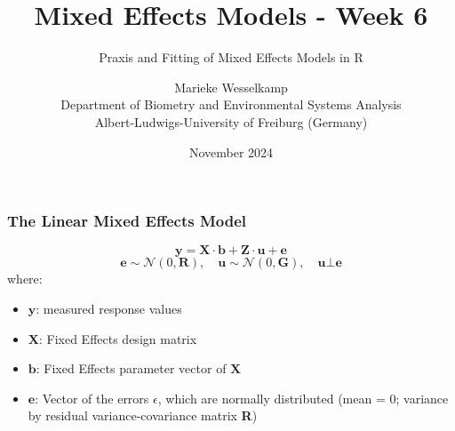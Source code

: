 \documentclass{beamer}
\title{Mixed Effects Models - Week 6}
\subtitle{Praxis and Fitting of Mixed Effects Models in R}
\author{Marieke Wesselkamp\\Department of Biometry and Environmental Systems Analysis\\Albert-Ludwigs-University of Freiburg (Germany)}
\date{November 2024}
\begin{document}
\frame{\titlepage}

\begin{frame}
    \frametitle{The Linear Mixed Effects Model}
    \[
    \mathbf{y} = \mathbf{X} \cdot \mathbf{b} + \mathbf{Z} \cdot \mathbf{u} + \mathbf{e}
    \]
    \[
    \mathbf{e} \sim \mathcal{N}(0, \mathbf{R}), \quad \mathbf{u} \sim \mathcal{N}(0, \mathbf{G}), \quad \mathbf{u} \bot \mathbf{e}
    \]
    where:
    \begin{itemize}
        \item $\mathbf{y}$: measured response values
        \item $\mathbf{X}$: Fixed Effects design matrix
        \item $\mathbf{b}$: Fixed Effects parameter vector of $\mathbf{X}$
        \item $\mathbf{e}$: Vector of the errors $\epsilon$, which are normally distributed (mean = 0; variance by residual variance-covariance matrix \textbf{R})
    \end{itemize}
\end{frame}
\end{document}
